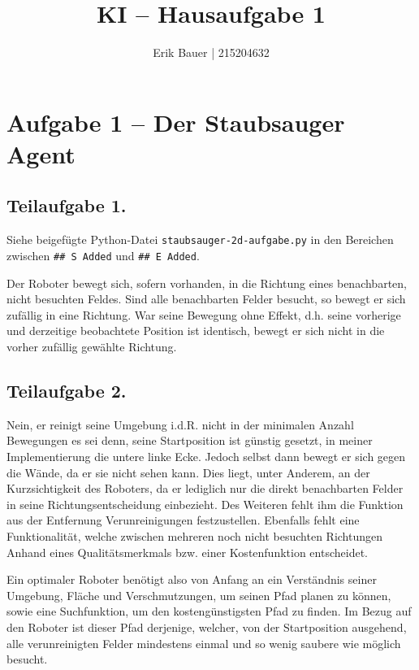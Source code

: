 \documentclass[
  a4paper,
  11pt,
]{scrartcl}
\title{KI -- Hausaufgabe 1}
\subtitle{Erik Bauer | 215204632}
\date{}
\begin{document}
\maketitle

\section*{Aufgabe 1 -- Der Staubsauger Agent}

\subsection*{Teilaufgabe 1.}

Siehe beigefügte Python-Datei \verb|staubsauger-2d-aufgabe.py| in den Bereichen zwischen \verb|## S Added| und \verb|## E Added|.

Der Roboter bewegt sich, sofern vorhanden, in die Richtung eines benachbarten, nicht besuchten Feldes.
Sind alle benachbarten Felder besucht, so bewegt er sich zufällig in eine Richtung.
War seine Bewegung ohne Effekt, d.h. seine vorherige und derzeitige beobachtete Position ist identisch, bewegt er sich nicht in die vorher zufällig gewählte Richtung.

\subsection*{Teilaufgabe 2.}

Nein, er reinigt seine Umgebung i.d.R. nicht in der minimalen Anzahl Bewegungen es sei denn, seine Startposition ist günstig gesetzt, in meiner Implementierung die untere linke Ecke. Jedoch selbst dann bewegt er sich gegen die Wände, da er sie nicht sehen kann. Dies liegt, unter Anderem, an der \glqq Kurzsichtigkeit\grqq{} des Roboters, da er lediglich nur die direkt benachbarten Felder in seine Richtungsentscheidung einbezieht. Des Weiteren fehlt ihm die Funktion aus der Entfernung Verunreinigungen festzustellen. Ebenfalls fehlt eine Funktionalität, welche zwischen mehreren noch nicht besuchten Richtungen Anhand eines Qualitätsmerkmals bzw. einer Kostenfunktion entscheidet.

Ein optimaler Roboter benötigt also von Anfang an ein Verständnis seiner Umgebung, Fläche und Verschmutzungen, um seinen Pfad planen zu können, sowie eine Suchfunktion, um den kostengünstigsten Pfad zu finden. Im Bezug auf den Roboter ist dieser Pfad derjenige, welcher, von der Startposition ausgehend, alle verunreinigten Felder mindestens einmal und so wenig saubere wie möglich besucht.
\end{document}

